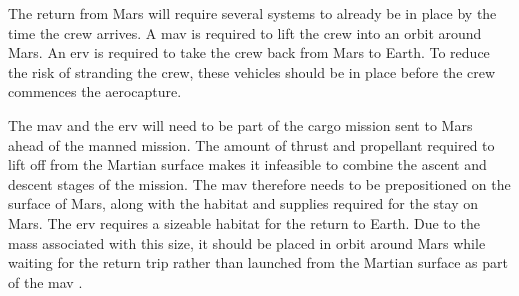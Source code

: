 The return from Mars will require several systems to already be in place by the time the crew arrives. A \gls{mav} is required to lift the crew into an orbit around Mars. An \gls{erv} is required to take the crew back from Mars to Earth. To reduce the risk of stranding the crew, these vehicles should be in place before the crew commences the aerocapture. 

The \gls{mav} and the \gls{erv} will need to be part of the cargo mission sent to Mars ahead of the manned mission. The amount of thrust and propellant required to lift off from the Martian surface makes it infeasible to combine the ascent and descent stages of the mission. The \gls{mav} therefore needs to be prepositioned on the surface of Mars, along with the habitat and supplies required for the stay on Mars. The \gls{erv} requires a sizeable habitat for the return to Earth. Due to the mass associated with this size, it should be placed in orbit around Mars while waiting for the return trip rather than launched from the Martian surface as part of the \gls{mav} \cite{Hoffman1997a}.